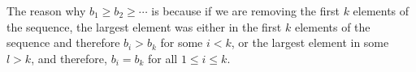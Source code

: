 \documentclass[12pt]{article}
\begin{document}
The reason why $b_1 \geq b_2 \geq \cdots$ is because if we are removing the first $k$ elements of the sequence, the largest element was either in the first $k$ elements of the sequence and therefore $b_i > b_k$ for some $i <k$, or the largest element in some $l > k$, and therefore, $b_i = b_k$ for all $1 \leq i \leq k$. 
\end{document}
